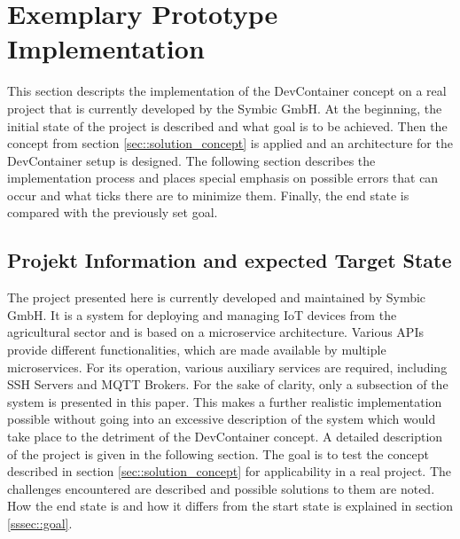 
\section{Exemplary Prototype Implementation}\label{sec::solution_code}
This section descripts the implementation of the DevContainer concept on a real project that is currently developed by the Symbic GmbH. At the beginning, the initial state of the project is described and what goal is to be achieved. Then the concept from section \ref{sec::solution_concept} is applied and an architecture for the DevContainer setup is designed. The following section describes the implementation process and places special emphasis on possible errors that can occur and what ticks there are to minimize them. Finally, the end state is compared with the previously set goal.

    \subsection{Projekt Information and expected Target State}
    The project presented here is currently developed and maintained by Symbic GmbH. It is a system for deploying and managing \ac{IoT} devices from the agricultural sector and is based on a microservice architecture. Various \ac{API}s provide different functionalities, which are made available by multiple microservices. For its operation, various auxiliary services are required, including SSH Servers and MQTT Brokers. For the sake of clarity, only a subsection of the system is presented in this paper. This makes a further realistic implementation possible without going into an excessive description of the system which would take place to the detriment of the DevContainer concept. A detailed description of the project is given in the following section. \newline
    The goal is to test the concept described in section \ref{sec::solution_concept} for applicability in a real project. The challenges encountered are described and possible solutions to them are noted. How the end state is and how it differs from the start state is explained in section \ref{sssec::goal}.

